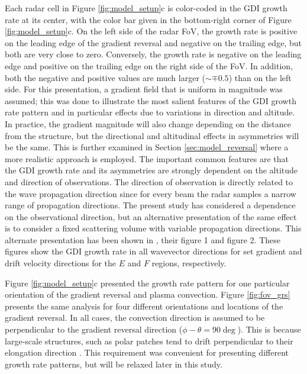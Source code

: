 Each radar cell in Figure \ref{fig:model_setup}c is color-coded in the GDI growth rate at its center, with the color bar given in the bottom-right corner of Figure \ref{fig:model_setup}c.  On the left side of the radar FoV, the growth rate is positive on the leading edge of the gradient reversal and negative on the trailing edge, but both are very close to zero.  Conversely, the growth rate is negative on the leading edge and positive on the trailing edge on the right side of the FoV.  In addition, both the negative and positive values are much larger (\(\sim\mp0.5\)) than on the left side. For this presentation, a gradient field that is uniform in magnitude was assumed; this was done to illustrate the most salient features of the GDI growth rate pattern and in particular effects due to variations in direction and altitude. In practice, the gradient magnitude will also change depending on the distance from the structure, but the directional and altitudinal effects in asymmetries will be the same. This is further examined in Section \ref{sec:model_reversal} where a more realistic approach is employed. The important common features are that the GDI growth rate and its asymmetries are strongly dependent on the altitude and direction of observations.  The direction of observation is directly related to the wave propagation direction since for every beam the radar samples a narrow range of propagation directions.  The present study has considered a dependence on the observational direction, but an alternative presentation of the same effect is to consider a fixed scattering volume with variable propagation directions.  This alternate presentation has been shown in \citet{Makarevich2014c}, their figure 1 and figure 2.  These figures show the GDI growth rate in all wavevector directions for set gradient and drift velocity directions for the \(E\) and \(F\) regions, respectively.


Figure \ref{fig:model_setup}c presented the growth rate pattern for one particular orientation of the gradient reversal and plasma convection. Figure \ref{fig:fov_grs} presents the same analysis for four different orientations and locations of the gradient reversal. In all cases, the convection direction is assumed to be perpendicular to the gradient reversal direction (\(\phi-\theta=90\deg\)).  This is because large-scale structures, such as polar patches tend to drift perpendicular to their elongation direction \citep{Makarevitch2004c,Makarevich2015b}. This requirement was convenient for presenting different growth rate patterns, but will be relaxed later in this study.



